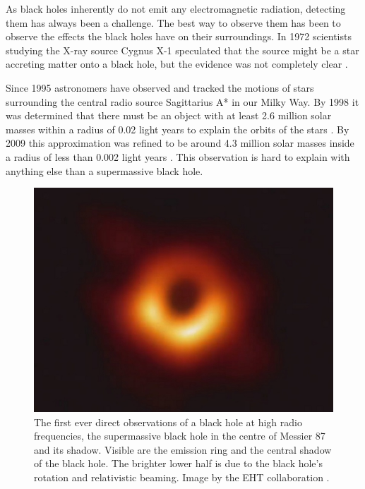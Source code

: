 \documentclass[english, oneside]{HYgradu}
\begin{document}
As black holes inherently do not emit any electromagnetic radiation, detecting them has always been a challenge. The best way to observe them has been to observe the effects the black holes have on their surroundings. In 1972 scientists studying the X-ray source Cygnus X-1 speculated that the source might be a star accreting matter onto a black hole, but the evidence was not completely clear \citep{bolton:1972, webster:1972}.

Since 1995 astronomers have observed and tracked the motions of stars surrounding the central radio source Sagittarius A* in our Milky Way. By 1998 it was determined that there must be an object with at least 2.6 million solar masses within a radius of 0.02 light years to explain the orbits of the stars \citep{ghez:1998}. By 2009 this approximation was refined to be around 4.3 million solar masses inside a radius of less than 0.002 light years \citep{gillessen:2009}. This observation is hard to explain with anything else than a supermassive black hole.

\begin{figure}[h!tb]
\centering
\includegraphics[width=\textwidth]{../images/blackhole.jpg}
\caption{The first ever direct observations of a black hole at high radio frequencies, the supermassive black hole in the centre of Messier 87 and its shadow. Visible are the emission ring and the central shadow of the black hole. The brighter lower half is due to the black hole's rotation and relativistic beaming. Image by the EHT collaboration \citep{akiyama:2019}.}
\label{fig:BlackHole}
\end{figure}
\end{document}
